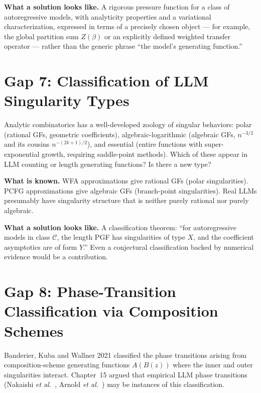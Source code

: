 \textbf{What a solution looks like.} A rigorous pressure function for a class of autoregressive models, with analyticity properties and a variational characterization, expressed in terms of a precisely chosen object --- for example, the global partition sum $Z(\beta)$ or an explicitly defined weighted transfer operator --- rather than the generic phrase ``the model's generating function.''

\section{Gap 7: Classification of LLM Singularity Types}
\label{ch18:gap7}

Analytic combinatorics has a well-developed zoology of singular behaviors: polar (rational GFs, geometric coefficients), algebraic-logarithmic (algebraic GFs, $n^{-3/2}$ and its cousins $n^{-(2k+1)/2}$), and essential (entire functions with super-exponential growth, requiring saddle-point methods). Which of these appear in LLM counting or length generating functions? Is there a new type?

\textbf{What is known.} WFA approximations give rational GFs (polar singularities). PCFG approximations give algebraic GFs (branch-point singularities). Real LLMs presumably have singularity structure that is neither purely rational nor purely algebraic.

\textbf{What a solution looks like.} A classification theorem: ``for autoregressive models in class $\mathcal{C}$, the length PGF has singularities of type $X$, and the coefficient asymptotics are of form $Y$.'' Even a conjectural classification backed by numerical evidence would be a contribution.

\section{Gap 8: Phase-Transition Classification via Composition Schemes}
\label{ch18:gap8}

Banderier, Kuba and Wallner 2021 \cite{BanderierKubaWallner2021} classified the phase transitions arising from composition-scheme generating functions $A(B(z))$ where the inner and outer singularities interact. Chapter~15 argued that empirical LLM phase transitions (Nakaishi \emph{et al.}\ \cite{NakaishiNishikawaHukushima2024}, Arnold \emph{et al.}\ \cite{ArnoldEtAl2024}) may be instances of this classification.


